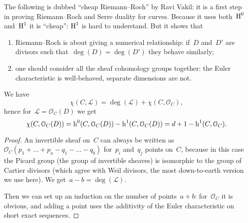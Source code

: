 \documentclass[10pt,a4paper]{article}
\begin{document}
The following is dubbed ``cheap Riemann--Roch'' by Ravi Vakil: it is a first step in proving Riemann--Roch and Serre duality for curves. Because it uses both~$\operatorname{H}^0$ and~$\operatorname{H}^1$ it is ``cheap'': $\operatorname{H}^1$ is hard to understand. But it shows that
\begin{enumerate}
  \item Riemann--Roch is about giving a numerical relationship: if~$D$ and~$D'$ are divisors such that~$\deg(D)=\deg(D')$ they behave similarly;
  \item one should consider all the sheaf cohomology groups together: the Euler characteristic is well-behaved, separate dimensions are not.
\end{enumerate}
\begin{lemma}
  \label{lemma:cheap-riemann-roch}
  We have
  \begin{equation}
    \chi(C,\mathcal{L})=\deg(\mathcal{L})+\chi(C,\mathcal{O}_C),
  \end{equation}
  hence for~$\mathcal{L}=\mathcal{O}_C(D)$ we get
  \begin{equation}
    \chi(C,\mathcal{O}_C(D))=\operatorname{h}^0(C,\mathcal{O}_C(D))-\operatorname{h}^1(C,\mathcal{O}_C(D))=d+1-\operatorname{h}^1(C,\mathcal{O}_C).
  \end{equation}

  \begin{proof}
    An invertible sheaf on~$C$ can always be written as~$\mathcal{O}_C(p_1+\dotso+p_a-q_1-\dotso-q_b)$ for~$p_i$ and~$q_j$ points on~$C$, because in this case the Picard group (the group of invertible sheaves) is isomorphic to the group of Cartier divisors (which agree with Weil divisors, the most down-to-earth version we use here). We get~$a-b=\deg(\mathcal{L})$.
    
    Then we can set up an induction on the number of points~$a+b$: for~$\mathcal{O}_C$ it is obvious, and adding a point uses the additivity of the Euler characteristic on short exact sequences.
  \end{proof}
\end{lemma}
\end{document}
